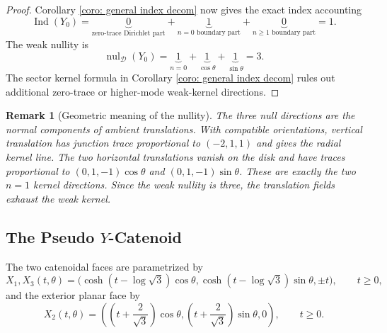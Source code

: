 \documentclass[11pt,twoside]{amsart}
\newtheorem{rem}[thm]{\bf{Remark}}
\numberwithin{equation}{section}
\begin{document}
\begin{proof}
Corollary \ref{coro: general index decom} now gives the exact index accounting
\[
\operatorname{Ind}(Y_0)
=\underbrace{0}_{\text{zero-trace Dirichlet part}}
+\underbrace{1}_{n=0\text{ boundary part}}
+\underbrace{0}_{n\ge1\text{ boundary part}}
=1.
\]
The weak nullity is
\[
\operatorname{nul}_{\mathcal D}(Y_0)
=\underbrace{1}_{n=0}
+\underbrace{1}_{\cos\theta}
+\underbrace{1}_{\sin\theta}
=3.
\]
The sector kernel formula in Corollary \ref{coro: general index decom} rules out additional zero-trace or higher-mode weak-kernel directions.
\end{proof}

\begin{rem}[Geometric meaning of the nullity] \label{rem: geometric meaning ycat}
\rm
The three null directions are the normal components of ambient translations. With compatible orientations, vertical translation has junction trace proportional to $(-2,1,1)$ and gives the radial kernel line. The two horizontal translations vanish on the disk and have traces proportional to $(0,1,-1)\cos\theta$ and $(0,1,-1)\sin\theta$. These are exactly the two $n=1$ kernel directions. Since the weak nullity is three, the translation fields exhaust the weak kernel.
\end{rem}

\subsection{The Pseudo \texorpdfstring{$Y$}{Y}-Catenoid} \label{sec: index of pseudo y-cat}
The two catenoidal faces are parametrized by
\[
X_1,X_3(t,\theta)=\bigl(\cosh(t-\log\sqrt3)\cos\theta,\cosh(t-\log\sqrt3)\sin\theta,\pm t\bigr),
\qquad t\ge0,
\]
and the exterior planar face by
\[
X_2(t,\theta)=\left(\left(t+\frac2{\sqrt3}\right)\cos\theta,\left(t+\frac2{\sqrt3}\right)\sin\theta,0\right),
\qquad t\ge0.
\]
\end{document}
